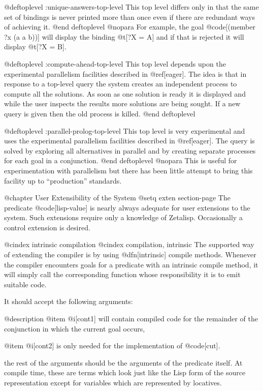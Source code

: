 {@deftoplevel :unique-answers-top-level
This top level differs only in that the same set of bindings is never printed
more than once even if there are redundant ways of achieving it.
@end deftoplevel
@nopara
For example, the goal
@code[(member ?x (a a b))] will display 
the binding @t[?X = A] and if that is rejected it will display @t[?X = B].

@deftoplevel :compute-ahead-top-level
This top level depends upon the experimental parallelism facilities described
in @ref[eager].
The idea is that in response to a top-level query the system creates an
independent process to compute all the solutions.
As soon as one solution is ready it is displayed and while the user inspects
the results more solutions are being sought.
If a new query is given then the old process is killed.
@end deftoplevel

@deftoplevel :parallel-prolog-top-level
This top level is very experimental and uses the experimental parallelism
facilities described in @ref[eager].
The query is solved by exploring all alternatives in parallel and by creating
separate processes for each goal in a conjunction.
@end deftoplevel
@nopara
This is useful for experimentation with parallelism but there has been little
attempt to bring this facility up to ``production'' standards.


@chapter User Extensibility of the System
@setq exten section-page
The predicate @code[lisp-value] is nearly always adequate for user extensions
to the system.
Such extensions require only a knowledge of Zetalisp.
Occasionally a control extension is desired.

@cindex intrinsic compilation
@cindex compilation, intrinsic
The supported way of extending the compiler is by using @dfn[intrinsic] compile
methods.  Whenever the compiler encounters goals for a predicate with
an intrinsic compile method, it will simply call 
the corresponding function whose responsibility it is to emit suitable code.

It should accept the following arguments:

@description
@item @i[cont1]
will contain compiled code for the remainder of the conjunction
in which the current goal occurs,

@item @i[cont2]
is only needed for the implementation of @code[cut].

the rest of the arguments should be the arguments of the predicate itself.
At compile time, these are terms which look just like the Lisp form
of the source representation except for variables which are represented
by locatives.

}
